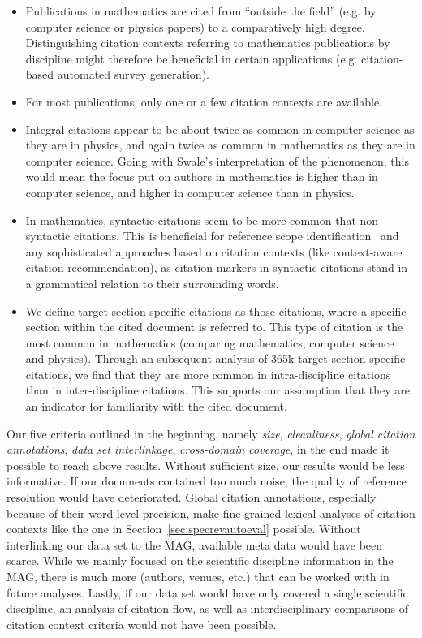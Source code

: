 \begin{itemize}
    \item Publications in mathematics are cited from ``outside the field'' (e.g. by computer science or physics papers) to a comparatively high degree. Distinguishing citation contexts referring to mathematics publications by discipline might therefore be beneficial in certain applications (e.g. citation-based automated survey generation).
    \item For most publications, only one or a few citation contexts are available.
    \item Integral citations appear to be about twice as common in computer science as they are in physics, and again twice as common in mathematics as they are in computer science. Going with Swale's interpretation of the phenomenon, this would mean the focus put on authors in mathematics is higher than in computer science, and higher in computer science than in physics.
    \item In mathematics, syntactic citations seem to be more common that non-syntactic citations. This is beneficial for reference scope identification~\cite{Abujbara2012} and any sophisticated approaches based on citation contexts (like context-aware citation recommendation), as citation markers in syntactic citations stand in a grammatical relation to their surrounding words.
    \item We define target section specific citations as those citations, where a specific section within the cited document is referred to. This type of citation is the most common in mathematics (comparing mathematics, computer science and physics). Through an subsequent analysis of 365k target section specific citations, we find that they are more common in intra-discipline citations than in inter-discipline citations. This supports our assumption that they are an indicator for familiarity with the cited document.
\end{itemize}

Our five criteria  outlined in the beginning, namely \emph{size}, \emph{cleanliness}, \emph{global citation annotations}, \emph{data set interlinkage}, \emph{cross-domain coverage}, in the end made it possible to reach above results. Without sufficient size, our results would be less informative. If our documents contained too much noise, the quality of reference resolution would have deteriorated. Global citation annotations, especially because of their word level precision, make fine grained lexical analyses of citation contexts like the one in Section~\ref{sec:specrevautoeval} possible. Without interlinking our data set to the MAG, available meta data would have been scarce. While we mainly focused on the scientific discipline information in the MAG, there is much more (authors, venues, etc.) that can be worked with in future analyses. Lastly, if our data set would have only covered a single scientific discipline, an analysis of citation flow, as well as interdisciplinary comparisons of citation context criteria would not have been possible.

